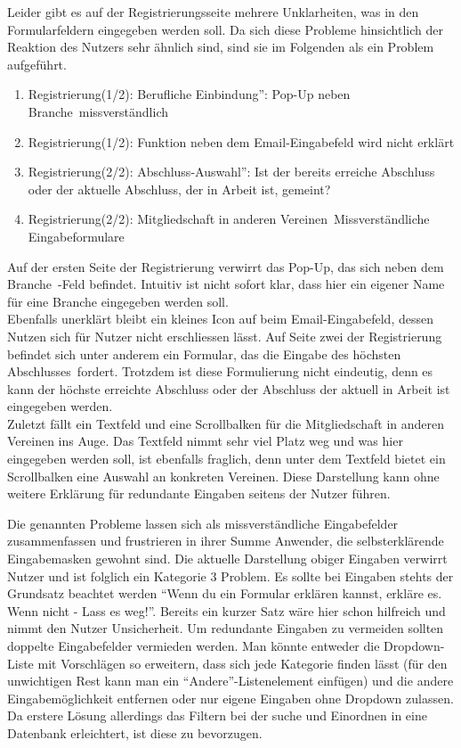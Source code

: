 { Leider gibt es auf der Registrierungsseite mehrere Unklarheiten, was in den Formularfeldern eingegeben werden soll. Da sich diese Probleme hinsichtlich der Reaktion
des Nutzers sehr ähnlich sind, sind sie im Folgenden als ein Problem aufgeführt.
\begin{enumerate}
	\item {Registrierung(1/2): \glqq Berufliche Einbindung”: Pop-Up neben \glqq Branche\grqq ~missverständlich}
	\item {Registrierung(1/2): Funktion neben dem Email-Eingabefeld wird nicht erklärt}
	\item {Registrierung(2/2): \glqq Abschluss-Auswahl”: Ist der bereits erreiche Abschluss oder der aktuelle Abschluss, der in Arbeit ist, gemeint? }
	\item {Registrierung(2/2): \glqq Mitgliedschaft in anderen Vereinen\grqq ~Missverständliche Eingabeformulare}	
\end{enumerate}	
Auf der ersten Seite der Registrierung verwirrt das Pop-Up, das sich neben dem \glqq Branche\grqq ~-Feld befindet. Intuitiv ist nicht sofort klar, dass hier ein eigener
Name für eine Branche eingegeben werden soll.\\
Ebenfalls unerklärt bleibt ein kleines Icon auf beim Email-Eingabefeld, dessen Nutzen sich für Nutzer nicht erschliessen lässt.
Auf Seite zwei der Registrierung befindet sich unter anderem ein Formular, das die Eingabe des \glqq höchsten Abschlusses\grqq ~fordert. Trotzdem ist diese Formulierung nicht eindeutig,
denn es kann der höchste erreichte Abschluss oder der Abschluss der aktuell in Arbeit ist eingegeben werden.\\
Zuletzt fällt ein Textfeld und eine Scrollbalken für die Mitgliedschaft in anderen Vereinen ins Auge. Das Textfeld nimmt sehr viel Platz weg und was hier eingegeben werden soll, ist ebenfalls fraglich, denn unter dem Textfeld bietet ein Scrollbalken eine Auswahl an konkreten Vereinen. Diese Darstellung kann ohne weitere Erklärung für redundante Eingaben seitens der Nutzer führen.
}
{ Die genannten Probleme lassen sich als missverständliche Eingabefelder zusammenfassen und frustrieren in ihrer Summe Anwender, die selbsterklärende Eingabemasken gewohnt sind. Die aktuelle Darstellung obiger Eingaben verwirrt Nutzer und ist folglich ein Kategorie 3 Problem.
}{
Es sollte bei Eingaben stehts der Grundsatz beachtet werden “Wenn du ein Formular erklären kannst, erkläre es. Wenn nicht - Lass es weg!”. Bereits ein kurzer Satz wäre hier schon hilfreich und nimmt den Nutzer Unsicherheit. Um redundante Eingaben zu vermeiden sollten doppelte Eingabefelder vermieden werden. Man könnte entweder die Dropdown-Liste mit Vorschlägen so erweitern, dass sich jede Kategorie finden lässt (für den unwichtigen Rest kann man ein “Andere”-Listenelement einfügen) und die andere Eingabemöglichkeit entfernen oder nur eigene Eingaben ohne Dropdown zulassen. Da erstere Lösung allerdings das Filtern bei der suche und Einordnen in eine Datenbank erleichtert, ist diese zu bevorzugen.}
  



